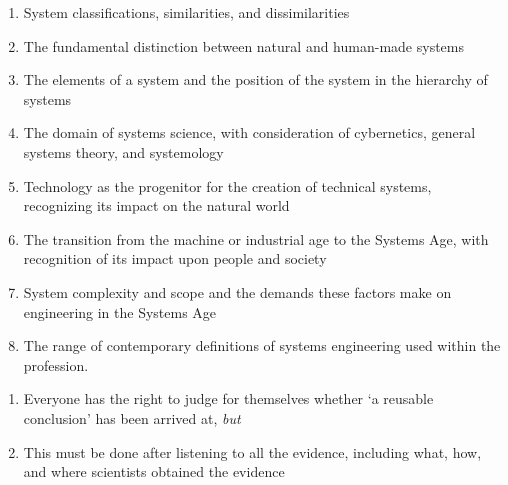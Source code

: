 \begin{enumerate}
	\item System classifications, similarities, and dissimilarities
	\item The fundamental distinction between natural and human-made systems
	\item The elements of a system and the position of the system in the hierarchy of systems
	\item The domain of systems science, with consideration of cybernetics, general systems theory, and systemology
	\item Technology as the progenitor for the creation of technical systems, recognizing its impact on the natural world
	\item The transition from the machine or industrial age to the Systems Age, with recognition of its impact upon people and society
	\item System complexity and scope and the demands these factors make on engineering in the Systems Age
	\item The range of contemporary definitions of systems engineering used within the profession.
\end{enumerate}

\begin{enumerate}
	\item Everyone has the right to judge for themselves whether `a reusable conclusion’ has been arrived at, \textit{but}
	\item This must be done after listening to all the evidence, including what, how, and where scientists obtained the evidence
\end{enumerate}

